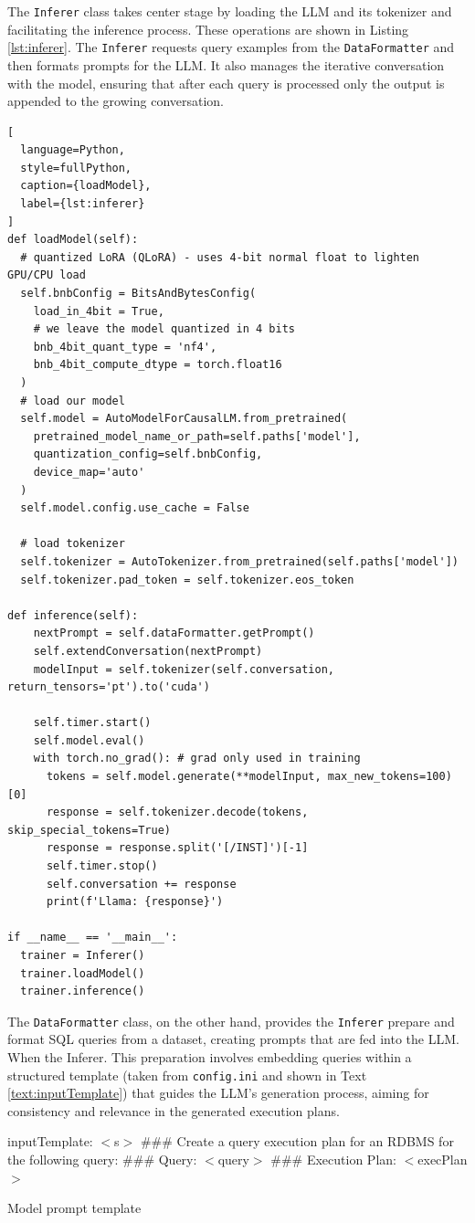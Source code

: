 The \lstinline{Inferer} class takes center stage by loading the LLM and its tokenizer and facilitating the inference process. These operations are shown in Listing \ref{lst:inferer}. The \lstinline{Inferer} requests query examples from the \lstinline{DataFormatter} and then formats prompts for the LLM. It also manages the iterative conversation with the model, ensuring that after each query is processed only the output is appended to the growing conversation.
\begin{lstlisting}[
  language=Python,
  style=fullPython,
  caption={loadModel},
  label={lst:inferer}
]
def loadModel(self):
  # quantized LoRA (QLoRA) - uses 4-bit normal float to lighten GPU/CPU load
  self.bnbConfig = BitsAndBytesConfig(
    load_in_4bit = True,
    # we leave the model quantized in 4 bits
    bnb_4bit_quant_type = 'nf4',
    bnb_4bit_compute_dtype = torch.float16
  )
  # load our model
  self.model = AutoModelForCausalLM.from_pretrained(
    pretrained_model_name_or_path=self.paths['model'],
    quantization_config=self.bnbConfig,
    device_map='auto'
  )
  self.model.config.use_cache = False

  # load tokenizer
  self.tokenizer = AutoTokenizer.from_pretrained(self.paths['model'])
  self.tokenizer.pad_token = self.tokenizer.eos_token

def inference(self):
    nextPrompt = self.dataFormatter.getPrompt()
    self.extendConversation(nextPrompt)
    modelInput = self.tokenizer(self.conversation, return_tensors='pt').to('cuda')

    self.timer.start()
    self.model.eval()
    with torch.no_grad(): # grad only used in training
      tokens = self.model.generate(**modelInput, max_new_tokens=100)[0]
      response = self.tokenizer.decode(tokens, skip_special_tokens=True)
      response = response.split('[/INST]')[-1]
      self.timer.stop()
      self.conversation += response
      print(f'Llama: {response}')

if __name__ == '__main__':
  trainer = Inferer()
  trainer.loadModel()
  trainer.inference()
\end{lstlisting}

The \lstinline{DataFormatter} class, on the other hand, provides the \lstinline{Inferer} prepare and format SQL queries from a dataset, creating prompts that are fed into the LLM. When the Inferer. This preparation involves embedding queries within a structured template (taken from \lstinline{config.ini} and shown in Text \ref{text:inputTemplate}) that guides the LLM's generation process, aiming for consistency and relevance in the generated execution plans.
\begin{text}
  inputTemplate: $<$s$>$ \#\#\# Create a query execution plan for an RDBMS for the following query: \#\#\# Query: $<$query$>$ \#\#\# Execution Plan: $<$execPlan$>$
  \caption{Model prompt template}
  \label{text:inputTemplate}
\end{text}

